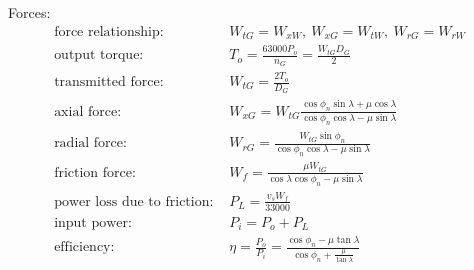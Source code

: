 \documentclass[11pt, fleqn]{article}
\begin{document}
Forces:
\begin{align*}
    \text{force relationship: }&W_{tG}=W_{xW},\ W_{xG}=W_{tW},\ W_{rG}=W_{rW}\\
    \text{output torque: }&T_o=\frac{63000P_o}{n_G}=\frac{W_{tG}D_G}{2}\\
    \text{transmitted force: }&W_{tG}=\frac{2T_o}{D_G}\\
    \text{axial force: }&W_{xG}=W_{tG}\frac{\cos\phi_n\sin\lambda+\mu\cos\lambda}{\cos\phi_n\cos\lambda-\mu\sin\lambda}\\
    \text{radial force: }&W_{rG}=\frac{W_{tG}\sin\phi_n}{\cos\phi_n\cos\lambda-\mu\sin\lambda}\\
    \text{friction force: }&W_f=\frac{\mu W_{tG}}{\cos\lambda\cos\phi_n-\mu\sin\lambda}\\
    \text{power loss due to friction: }&P_L=\frac{v_sW_f}{33000}\\
    \text{input power: }&P_i=P_o+P_L\\
    \text{efficiency: }&\eta=\frac{P_o}{P_i}=\frac{\cos\phi_n-\mu\tan\lambda}{\cos\phi_n+\frac{\mu}{\tan\lambda}}
\end{align*}
\end{document}
